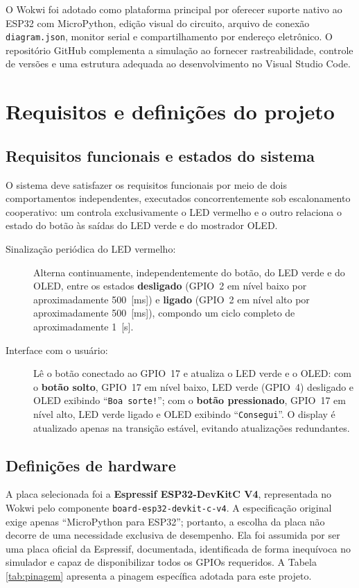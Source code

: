 \documentclass[12pt,a4paper]{article}
\begin{document}
O Wokwi foi adotado como plataforma principal por oferecer suporte nativo ao ESP32 com MicroPython, edição visual do circuito, arquivo de conexão \texttt{diagram.json}, monitor serial e compartilhamento por endereço eletrônico. O repositório GitHub complementa a simulação ao fornecer rastreabilidade, controle de versões e uma estrutura adequada ao desenvolvimento no Visual Studio Code.

\section{Requisitos e definições do projeto}

\subsection{Requisitos funcionais e estados do sistema}

O sistema deve satisfazer os requisitos funcionais por meio de dois comportamentos independentes, executados concorrentemente sob escalonamento cooperativo: um controla exclusivamente o LED vermelho e o outro relaciona o estado do botão às saídas do LED verde e do mostrador OLED.

\begin{description}
  \item[Sinalização periódica do LED vermelho:] Alterna continuamente, independentemente do botão, do LED verde e do OLED, entre os estados \textbf{desligado} (GPIO~2 em nível baixo por aproximadamente 500~[ms]) e \textbf{ligado} (GPIO~2 em nível alto por aproximadamente 500~[ms]), compondo um ciclo completo de aproximadamente 1~[s].

  \item[Interface com o usuário:] Lê o botão conectado ao GPIO~17 e atualiza o LED verde e o OLED: com o \textbf{botão solto}, GPIO~17 em nível baixo, LED verde (GPIO~4) desligado e OLED exibindo \enquote{\texttt{Boa sorte!}}; com o \textbf{botão pressionado}, GPIO~17 em nível alto, LED verde ligado e OLED exibindo \enquote{\texttt{Consegui}}. O display é atualizado apenas na transição estável, evitando atualizações redundantes.
\end{description}

\subsection{Definições de hardware}

A placa selecionada foi a \textbf{Espressif ESP32-DevKitC V4}, representada no Wokwi pelo componente \texttt{board-esp32-devkit-c-v4}. A especificação original exige apenas \enquote{MicroPython para ESP32}; portanto, a escolha da placa não decorre de uma necessidade exclusiva de desempenho. Ela foi assumida por ser uma placa oficial da Espressif, documentada, identificada de forma inequívoca no simulador e capaz de disponibilizar todos os GPIOs requeridos. A Tabela \ref{tab:pinagem} apresenta a pinagem específica adotada para este projeto.
\end{document}
